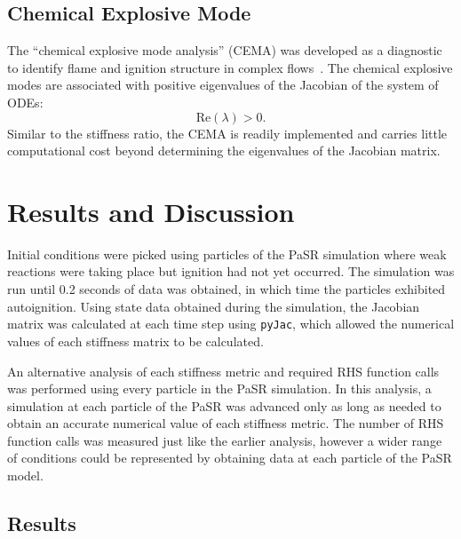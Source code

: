 \documentclass[12pt]{ussci}
\begin{document}
\subsection{Chemical Explosive Mode}
The ``chemical explosive mode analysis'' (CEMA) was developed as a diagnostic to identify flame and ignition structure in complex flows~\cite{Yoo2009}.
The chemical explosive modes are associated with positive eigenvalues of the Jacobian of the system of ODEs:
\begin{equation}
	\textrm{Re}(\lambda) > 0.
\end{equation}
Similar to the stiffness ratio, the CEMA is readily implemented and carries little computational cost beyond determining the eigenvalues of the Jacobian matrix.

\section{Results and Discussion}
Initial conditions were picked using particles of the PaSR simulation where weak reactions were taking place but ignition had not yet occurred.  The simulation was run until 0.2 seconds of data was obtained, in which time the particles exhibited autoignition.  Using state data obtained during the simulation, the Jacobian matrix was calculated at each time step using \texttt{pyJac}, which allowed the numerical values of each stiffness matrix to be calculated.

An alternative analysis of each stiffness metric and required RHS function calls was performed using every particle in the PaSR simulation.  In this analysis, a simulation at each particle of the PaSR was advanced only as long as needed to obtain an accurate numerical value of each stiffness metric.  The number of RHS function calls was measured just like the earlier analysis, however a wider range of conditions could be represented by obtaining data at each particle of the PaSR model.



\subsection{Results}
\end{document}
